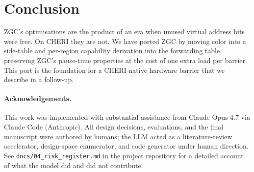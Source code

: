 \documentclass[acmsmall,nonacm]{acmart}
\begin{document}
\section{Conclusion}
\label{sec:conc}

ZGC's optimisations are the product of an era when unused virtual
address bits were free. On CHERI they are not. We have ported ZGC by
moving color into a side-table and per-region capability derivation
into the forwarding table, preserving ZGC's pause-time properties at
the cost of one extra load per barrier. This port is the foundation
for a CHERI-native hardware barrier that we describe in a follow-up.

\paragraph{Acknowledgements.}
This work was implemented with substantial assistance from Claude Opus
4.7 via Claude Code (Anthropic). All design decisions, evaluations,
and the final manuscript were authored by humans; the LLM acted as a
literature-review accelerator, design-space enumerator, and code
generator under human direction. See \texttt{docs/04\_risk\_register.md}
in the project repository for a detailed account of what the model
did and did not contribute.



\end{document}
